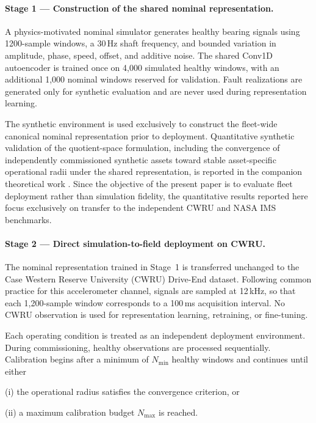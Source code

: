 \documentclass[numbered]{trbunofficial}
\begin{document}
\paragraph{Stage 1 --- Construction of the shared nominal representation.}

A physics-motivated nominal simulator generates healthy bearing signals
using 1200-sample windows, a 30\,Hz shaft frequency, and bounded variation
in amplitude, phase, speed, offset, and additive noise.
The shared Conv1D autoencoder is trained once on 4,000 simulated healthy
windows, with an additional 1,000 nominal windows reserved for validation.
Fault realizations are generated only for synthetic evaluation and are never
used during representation learning.

The synthetic environment is used exclusively to construct the fleet-wide
canonical nominal representation prior to deployment. Quantitative synthetic
validation of the quotient-space formulation, including the convergence of
independently commissioned synthetic assets toward stable asset-specific
operational radii under the shared representation, is reported in the
companion theoretical work
\citep{disanti2026quotient,disanti2026inverse}. Since the objective of the
present paper is to evaluate fleet deployment rather than simulation
fidelity, the quantitative results reported here focus exclusively on
transfer to the independent CWRU and NASA IMS benchmarks.

\paragraph{Stage 2 --- Direct simulation-to-field deployment on CWRU.}

The nominal representation trained in Stage~1 is transferred unchanged to the
Case Western Reserve University (CWRU) Drive-End dataset. Following common
practice for this accelerometer channel, signals are sampled at 12\,kHz, so
that each 1,200-sample window corresponds to a 100\,ms acquisition interval.
No CWRU observation is used for representation learning, retraining, or
fine-tuning.

Each operating condition is treated as an independent deployment environment.
During commissioning, healthy observations are processed sequentially.
Calibration begins after a minimum of $N_{\min}$ healthy windows and continues
until either

(i) the operational radius satisfies the convergence criterion, or

(ii) a maximum calibration budget $N_{\max}$ is reached.
\end{document}
